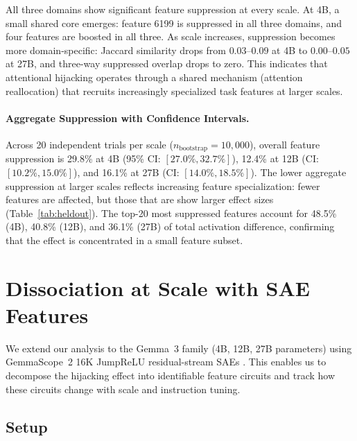 \documentclass[10pt,twocolumn]{article}
\newcommand{\gemma}{Gemma~3\xspace}
\newcommand{\gemmascope}{GemmaScope~2\xspace}
\begin{document}
All three domains show significant feature suppression at every scale.
At 4B, a small shared core emerges: feature 6199 is suppressed in all three domains, and four features are boosted in all three.
As scale increases, suppression becomes more domain-specific: Jaccard similarity drops from $0.03$--$0.09$ at 4B to $0.00$--$0.05$ at 27B, and three-way suppressed overlap drops to zero.
This indicates that attentional hijacking operates through a shared mechanism (attention reallocation) that recruits increasingly specialized task features at larger scales.

\paragraph{Aggregate Suppression with Confidence Intervals.}
Across 20 independent trials per scale ($n_{\text{bootstrap}} = 10{,}000$), overall feature suppression is 29.8\% at 4B (95\% CI: $[27.0\%, 32.7\%]$), 12.4\% at 12B (CI: $[10.2\%, 15.0\%]$), and 16.1\% at 27B (CI: $[14.0\%, 18.5\%]$).
The lower aggregate suppression at larger scales reflects increasing feature specialization: fewer features are affected, but those that are show larger effect sizes (Table~\ref{tab:heldout}).
The top-20 most suppressed features account for 48.5\% (4B), 40.8\% (12B), and 36.1\% (27B) of total activation difference, confirming that the effect is concentrated in a small feature subset.

\section{Dissociation at Scale with SAE Features}
\label{sec:scaling}

We extend our analysis to the \gemma family (4B, 12B, 27B parameters) using \gemmascope 16K JumpReLU residual-stream SAEs \citep{lieberum2024gemma}.
This enables us to decompose the hijacking effect into identifiable feature circuits and track how these circuits change with scale and instruction tuning.

\subsection{Setup}
\end{document}
